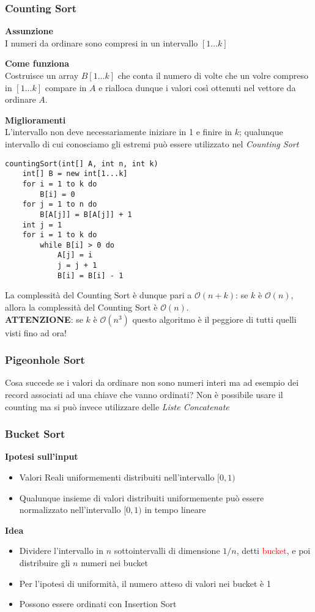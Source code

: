 \documentclass[../cheatSheetAlgoritmi.tex]{subfiles}
\begin{document}
\subsubsection{Counting Sort}
\textbf{Assunzione}\\
I numeri da ordinare sono compresi in un intervallo $[1...k]$

\bigskip
\textbf{Come funziona}\\
Costruisce un array $B[1...k]$ che conta il numero di volte che un volre compreso in $[1...k]$ compare in $A$ e rialloca dunque i valori così ottenuti nel vettore da ordinare $A$.

\bigskip
\textbf{Miglioramenti}\\
L'intervallo non deve necessariamente iniziare in 1 e finire in $k$; qualunque intervallo di cui conosciamo gli estremi può essere utilizzato nel \emph{Counting Sort}
\begin{lstlisting}[caption=Counting Sort]
countingSort(int[] A, int n, int k)
	int[] B = new int[1...k]
	for i = 1 to k do
		B[i] = 0
	for j = 1 to n do
		B[A[j]] = B[A[j]] + 1
	int j = 1
	for i = 1 to k do
		while B[i] > 0 do
			A[j] = i
			j = j + 1
			B[i] = B[i] - 1
\end{lstlisting}
La complessità del Counting Sort è dunque pari a $\mathcal{O}(n + k)$: se $k$ è $\mathcal{O}(n)$, allora la complessità del Counting Sort è $\mathcal{O}(n)$.\\
\textbf{ATTENZIONE}: se $k$ è $\mathcal{O}(n^{3})$ questo algoritmo è il peggiore di tutti quelli visti fino ad ora!
\subsubsection{Pigeonhole Sort}
Cosa succede se i valori da ordinare non sono numeri interi ma ad esempio dei record associati ad una chiave che vanno ordinati? Non è possibile usare il counting ma si può invece utilizzare delle \emph{Liste Concatenate}
\subsubsection{Bucket Sort}
\textbf{Ipotesi sull'input}
\begin{itemize}
	\item Valori Reali uniformementi distribuiti nell'intervallo $[0, 1)$
	\item Qualunque insieme di valori distribuiti uniformemente può essere normalizzato nell'intervallo $[0, 1)$ in tempo lineare
\end{itemize}
\textbf{Idea}
\begin{itemize}
	\item Dividere l'intervallo in $n$ sottointervalli di dimensione $1/n$, detti \textcolor{red}{bucket}, e poi distribuire gli $n$ numeri nei bucket
	\item Per l'ipotesi di uniformità, il numero atteso di valori nei bucket è 1
	\item Possono essere ordinati con Insertion Sort
\end{itemize}
\end{document}
